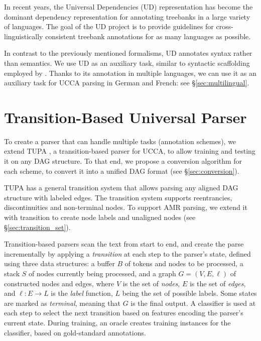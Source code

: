 \documentclass[11pt,a4paper]{article}
\begin{document}
In recent years, the Universal Dependencies
(UD) representation \cite{nivre2016universal,11234/1-2515} has become
the dominant dependency representation for
annotating treebanks in a large variety of languages.
The goal of the UD project is to provide
guidelines for cross-linguistically consistent treebank
annotations for as many languages as possible.

In contrast to the previously mentioned formalisms,
UD annotates syntax rather than semantics.
We use UD as an auxiliary task,
similar to syntactic scaffolding employed by \cite{swayamdipta2017frame}.
Thanks to its annotation in multiple languages, we can use it as an auxiliary task
for UCCA parsing in German and French: see \S\ref{sec:multilingual}.



\section{Transition-Based Universal Parser}\label{sec:model}

To create a parser that can handle multiple tasks (annotation schemes),
we extend TUPA \cite{hershcovich2017a}, a transition-based parser for UCCA,
to allow training and testing it on any DAG structure.
To that end, we propose a conversion algorithm for each scheme,
to convert it into a unified DAG format (see \S\ref{sec:conversion}).

TUPA has a general transition system that allows parsing any aligned DAG structure with labeled edges.
The transition system supports reentrancies, discontinuities and non-terminal nodes.
To support AMR parsing, we extend it with transition to create node labels and unaligned nodes
(see \S\ref{sec:transition_set}).

Transition-based parsers \cite{Nivre03anefficient} scan the text from start to end,
and create the parse incrementally by applying a \textit{transition}
at each step to the parser's state,
defined using three data structures: a buffer $B$ of tokens and nodes to be processed,
a stack $S$ of nodes currently being processed,
and a graph $G=(V,E,\ell)$ of constructed nodes and edges,
where $V$ is the set of \emph{nodes}, $E$ is the set of \emph{edges},
and $\ell : E \to L$ is the \emph{label} function, $L$ being the set of possible labels.
Some states are marked as \textit{terminal}, meaning that $G$ is the final output.
A classifier is used at each step to select the next transition based on features
encoding the parser's current state.
During training, an oracle creates training instances for the classifier,
based on gold-standard annotations.
\end{document}
